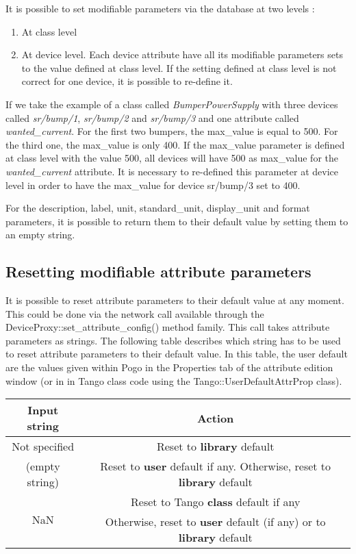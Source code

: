 \vspace{0.3cm}

It is possible to set modifiable parameters via the database at two
levels :
\begin{enumerate}
\item At class level
\item At device level. Each device attribute have all its modifiable parameters
sets to the value defined at class level. If the setting defined at
class level is not correct for one device, it is possible to re-define
it.
\end{enumerate}
If we take the example of a class called \emph{BumperPowerSupply}
with three devices called \emph{sr/bump/1}, \emph{sr/bump/2} and \emph{sr/bump/3}
and one attribute called \emph{wanted\_current}. For the first two
bumpers, the max\_value is equal to 500. For the third one, the max\_value
is only 400. If the max\_value parameter is defined at class level
with the value 500, all devices will have 500 as max\_value for the
\emph{wanted\_current} attribute. It is necessary to re-defined this
parameter at device level in order to have the max\_value for device
sr/bump/3 set to 400.

For the description, label, unit, standard\_unit, display\_unit and
format parameters, it is possible to return them to their default
value by setting them to an empty string.

\subsection{Resetting modifiable attribute parameters}

It is possible to reset attribute parameters to their default value
at any moment. This could be done via the network call available through
the DeviceProxy::set\_attribute\_config() method family. This call
takes attribute parameters as strings. The following table describes
which string has to be used to reset attribute parameters to their
default value. In this table, the user default are the values given
within Pogo in the \textquotedbl{}Properties\textquotedbl{} tab of
the attribute edition window (or in in Tango class code using the
Tango::UserDefaultAttrProp class).\vspace{0.3cm}

\begin{center}
\begin{longtable}{|c|c|}
\hline 
Input string & Action\tabularnewline
\hline 
\hline 
\textquotedbl{}Not specified\textquotedbl{} & Reset to \textbf{library} default\tabularnewline
\hline 
\multirow{2}{*}{\textquotedbl{}\textquotedbl{} (empty string)} & \multirow{2}{*}{Reset to \textbf{user} default if any. Otherwise, reset to \textbf{library}
default}\tabularnewline
 & \tabularnewline
\hline 
\multirow{2}{*}{\textquotedbl{}NaN\textquotedbl{}} & Reset to Tango \textbf{class} default if any\tabularnewline
 & Otherwise, reset to \textbf{user} default (if any) or to \textbf{library}
default\tabularnewline
\hline 
\end{longtable}
\par\end{center}

